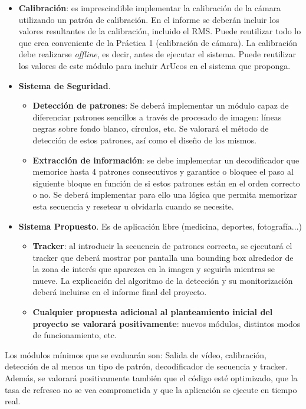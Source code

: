 \begin{itemize}
    \item \textbf{Calibración}: es imprescindible implementar la calibración de la cámara utilizando un patrón de calibración. En el informe se deberán incluir los valores resultantes de la calibración, incluido el RMS. Puede reutilizar todo lo que crea conveniente de la Práctica 1 (calibración de cámara). La calibración debe realizarse \textit{offline}, es decir, antes de ejecutar el sistema. Puede reutilizar los valores de este módulo para incluir ArUcos en el sistema que proponga.
    \item \textbf{Sistema de Seguridad}.
    \begin{itemize}
        \item \textbf{Detección de patrones}: Se deberá implementar un módulo capaz de diferenciar patrones sencillos a través de procesado de imagen: líneas negras sobre fondo blanco, círculos, etc. Se valorará el método de detección de estos patrones, así como el diseño de los mismos.
        
        \item \textbf{Extracción de información}: se debe implementar un decodificador que memorice hasta 4 patrones consecutivos y garantice o bloquee el paso al siguiente bloque en función de si estos patrones están en el orden correcto o no. Se deberá implementar para ello una lógica que permita memorizar esta secuencia y resetear u olvidarla cuando se necesite.
    \end{itemize}
    \item \textbf{Sistema Propuesto}. Es de aplicación libre (medicina, deportes, fotografía...)
    \begin{itemize}
        \item \textbf{Tracker}: al introducir la secuencia de patrones correcta, se ejecutará el tracker que deberá mostrar por pantalla una bounding box alrededor de la zona de interés que aparezca en la imagen y seguirla mientras se mueve. La explicación del algoritmo de la detección y su monitorización deberá incluirse en el informe final del proyecto.
        \item \textbf{Cualquier propuesta adicional al planteamiento inicial del proyecto se valorará positivamente}: nuevos módulos, distintos modos de funcionamiento, etc.
    \end{itemize}
\end{itemize}

Los módulos mínimos que se evaluarán son: Salida de vídeo, calibración, detección de al menos un tipo de patrón, decodificador de secuencia y tracker. Además, se valorará positivamente también que el código esté optimizado, que la tasa de refresco no se vea comprometida y que la aplicación se ejecute en tiempo real.
